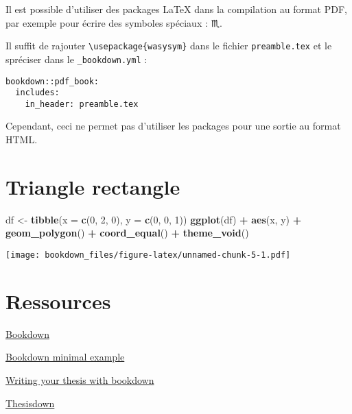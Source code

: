 \documentclass[]{book}
\newenvironment{Shaded}{\begin{snugshade}}{\end{snugshade}}
\newcommand{\DataTypeTok}[1]{\textcolor[rgb]{0.13,0.29,0.53}{#1}}
\newcommand{\DecValTok}[1]{\textcolor[rgb]{0.00,0.00,0.81}{#1}}
\newcommand{\KeywordTok}[1]{\textcolor[rgb]{0.13,0.29,0.53}{\textbf{#1}}}
\newcommand{\NormalTok}[1]{#1}
\newcommand{\OperatorTok}[1]{\textcolor[rgb]{0.81,0.36,0.00}{\textbf{#1}}}
\newcommand{\StringTok}[1]{\textcolor[rgb]{0.31,0.60,0.02}{#1}}
\theoremstyle{definition}
\theoremstyle{definition}
\theoremstyle{definition}
\theoremstyle{remark}
\begin{document}
Il est possible d'utiliser des packages LaTeX dans la compilation au format PDF, par exemple pour écrire des symboles spéciaux : \(\scorpio\).

Il suffit de rajouter \texttt{\textbackslash{}usepackage\{wasysym\}} dans le fichier \texttt{preamble.tex} et le spréciser dans le \texttt{\_bookdown.yml} :

\begin{verbatim}
bookdown::pdf_book:
  includes:
    in_header: preamble.tex
\end{verbatim}

Cependant, ceci ne permet pas d'utiliser les packages pour une sortie au format HTML.

\hypertarget{appendix-appendices}{%
\appendix}


\hypertarget{triangle-rectangle}{%
\chapter{Triangle rectangle}\label{triangle-rectangle}}

\begin{Shaded}
\begin{Highlighting}[]
\NormalTok{df <-}\StringTok{ }\KeywordTok{tibble}\NormalTok{(}\DataTypeTok{x =} \KeywordTok{c}\NormalTok{(}\DecValTok{0}\NormalTok{, }\DecValTok{2}\NormalTok{, }\DecValTok{0}\NormalTok{), }\DataTypeTok{y =} \KeywordTok{c}\NormalTok{(}\DecValTok{0}\NormalTok{, }\DecValTok{0}\NormalTok{, }\DecValTok{1}\NormalTok{))}
\KeywordTok{ggplot}\NormalTok{(df) }\OperatorTok{+}
\StringTok{  }\KeywordTok{aes}\NormalTok{(x, y) }\OperatorTok{+}
\StringTok{  }\KeywordTok{geom_polygon}\NormalTok{() }\OperatorTok{+}
\StringTok{  }\KeywordTok{coord_equal}\NormalTok{() }\OperatorTok{+}
\StringTok{  }\KeywordTok{theme_void}\NormalTok{() }
\end{Highlighting}
\end{Shaded}

\texttt{[image: bookdown\_files/figure-latex/unnamed-chunk-5-1.pdf]}

\hypertarget{ressources}{%
\chapter{Ressources}\label{ressources}}

\href{https://bookdown.org/yihui/bookdown/}{Bookdown}

\href{https://bookdown.org/yihui/bookdown-demo/}{Bookdown minimal example}

\href{https://eddjberry.netlify.com/post/writing-your-thesis-with-bookdown/}{Writing your thesis with bookdown}

\href{https://github.com/ismayc/thesisdown}{Thesisdown}


\end{document}
